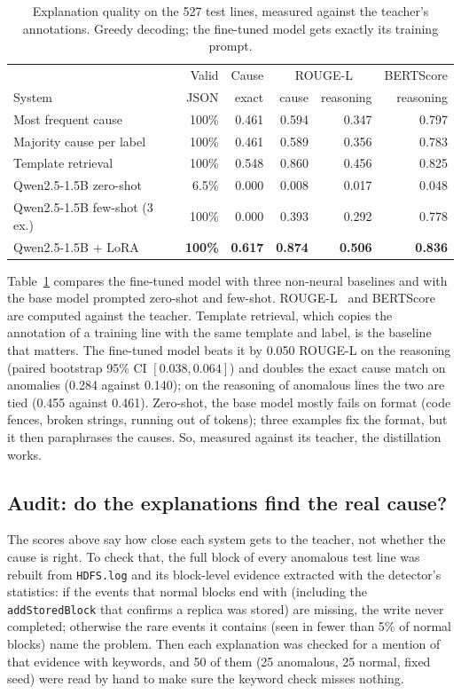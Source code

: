 \documentclass[11pt,a4paper]{article}
\newcommand{\code}[1]{\texttt{#1}}
\begin{document}
\begin{table}[t]
\centering
\caption{Explanation quality on the 527 test lines, measured against the teacher's annotations.
Greedy decoding; the fine-tuned model gets exactly its training prompt.}
\label{tab:expl}
\small\setlength{\tabcolsep}{4pt}
\begin{tabular}{lrrrrr}
\toprule
 & Valid & Cause & \multicolumn{2}{c}{ROUGE-L} & BERTScore \\
System & JSON & exact & cause & reasoning & reasoning \\
\midrule
Most frequent cause & 100\% & 0.461 & 0.594 & 0.347 & 0.797 \\
Majority cause per label & 100\% & 0.461 & 0.589 & 0.356 & 0.783 \\
Template retrieval & 100\% & 0.548 & 0.860 & 0.456 & 0.825 \\
Qwen2.5-1.5B zero-shot & 6.5\% & 0.000 & 0.008 & 0.017 & 0.048 \\
Qwen2.5-1.5B few-shot (3 ex.) & 100\% & 0.000 & 0.393 & 0.292 & 0.778 \\
Qwen2.5-1.5B + LoRA & \textbf{100\%} & \textbf{0.617} & \textbf{0.874} & \textbf{0.506} & \textbf{0.836} \\
\bottomrule
\end{tabular}
\end{table}

Table~\ref{tab:expl} compares the fine-tuned model with three non-neural baselines and with
the base model prompted zero-shot and few-shot. ROUGE-L~\cite{lin2004} and
BERTScore~\cite{zhang2020} are computed against the teacher. Template retrieval, which copies
the annotation of a training line with the same template and label, is the baseline that
matters. The fine-tuned model beats it by 0.050 ROUGE-L on the reasoning (paired bootstrap
95\% CI $[0.038, 0.064]$) and doubles the exact cause match on anomalies (0.284 against 0.140);
on the reasoning of anomalous lines the two are tied (0.455 against 0.461). Zero-shot, the base
model mostly fails on format (code fences, broken strings, running out of tokens); three
examples fix the format, but it then paraphrases the causes. So, measured against its teacher,
the distillation works.

\subsection{Audit: do the explanations find the real cause?}

The scores above say how close each system gets to the teacher, not whether the cause is
right. To check that, the full block of every anomalous test line was rebuilt from
\code{HDFS.log} and its block-level evidence extracted with the detector's statistics: if
the events that normal blocks end with (including the \code{addStoredBlock} that confirms a
replica was stored) are missing, the write never completed; otherwise the rare events it
contains (seen in fewer than 5\% of normal blocks) name the problem. Then each explanation was
checked for a mention of that evidence with keywords, and 50 of them (25 anomalous, 25 normal,
fixed seed) were read by hand to make sure the keyword check misses nothing.
\end{document}
